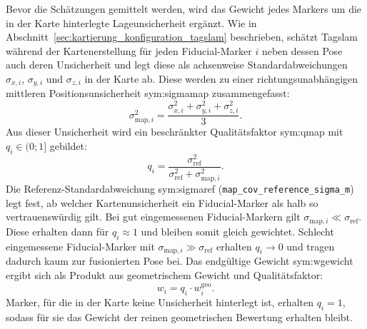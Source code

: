 Bevor die Schätzungen gemittelt werden, wird das Gewicht jedes Markers um die in der Karte hinterlegte Lageunsicherheit ergänzt.
Wie in Abschnitt~\ref{sec:kartierung_konfiguration_tagslam} beschrieben, schätzt Tag\gls{slam} während der Kartenerstellung für jeden Fiducial-Marker $i$ 
neben dessen Pose auch deren Unsicherheit und legt diese als 
achsenweise Standardabweichungen $\sigma_{x,i}$, $\sigma_{y,i}$ und $\sigma_{z,i}$ in der Karte ab.
Diese werden zu einer richtungsunabhängigen mittleren Positionsunsicherheit \gls{sym:sigmamap} zusammengefasst:
\begin{equation}
\sigma_{\mathrm{map},i}^{2} = \frac{\sigma_{x,i}^{2} + \sigma_{y,i}^{2} + \sigma_{z,i}^{2}}{3}.
\label{eq:pos_map_sigma}
\end{equation}
Aus dieser Unsicherheit wird ein beschränkter Qualitätsfaktor \gls{sym:qmap} mit $q_i \in (0;1]$ gebildet:
\begin{equation}
q_i = \frac{\sigma_{\mathrm{ref}}^{2}}{\sigma_{\mathrm{ref}}^{2} + \sigma_{\mathrm{map},i}^{2}}.
\label{eq:pos_map_quality}
\end{equation}
Die Referenz-Standardabweichung \gls{sym:sigmaref} (\texttt{map\_cov\_reference\_sigma\_m}) legt fest, ab welcher Kartenunsicherheit ein Fiducial-Marker als halb so vertrauenswürdig gilt.
Bei gut eingemessenen Fiducial-Markern gilt $\sigma_{\mathrm{map},i} \ll \sigma_{\mathrm{ref}}$. 
Diese erhalten dann für $q_i \approx 1$ und bleiben somit gleich gewichtet. 
Schlecht eingemessene Fiducial-Marker mit $\sigma_{\mathrm{map},i} \gg \sigma_{\mathrm{ref}}$ erhalten $q_i \to 0$ und tragen dadurch kaum zur fusionierten Pose bei.
Das endgültige Gewicht \gls{sym:wgewicht} ergibt sich als Produkt aus geometrischem Gewicht und Qualitätsfaktor:
\begin{equation}
w_i = q_i \cdot w_i^{\mathrm{geo}}.
\label{eq:pos_gewicht_kombiniert}
\end{equation}
Marker, für die in der Karte keine Unsicherheit hinterlegt ist, erhalten $q_i = 1$, sodass für sie das Gewicht der reinen geometrischen Bewertung erhalten bleibt.

